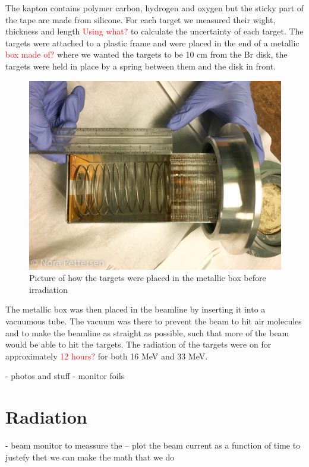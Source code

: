 \documentclass[twoside,english]{uiofysmaster/uiofysmaster}
\begin{document}
\noindent
The kapton contains polymer carbon, hydrogen and oxygen but the sticky part of the tape are made from silicone. For each target we measured their wight, thickness and length \textcolor{red}{Using what?} to calculate the uncertainty of each target. The targets were attached to a plastic frame and were placed in the end of a metallic \textcolor{red}{box made of?} where we wanted the targets to be 10 cm from the Br disk, the targets were held in place by a spring between them and the disk in front. 
\begin{figure} [h]
   \centering
   \includegraphics[scale=.2]{target_stack-1.JPG}
   \caption{Picture of how the targets were placed in the metallic box before irradiation}
   \label{fig:target_stack}
\end{figure}

\noindent
The metallic box was then placed in the beamline by inserting it into a vacuumous tube. The vacuum was there to prevent the beam to hit air molecules and to make the beamline as straight as possible, such that more of the beam would be able to hit the targets. The radiation of the targets were on for approximately \textcolor{red}{12 hours?} for both 16 MeV and 33 MeV. 
\cite{E.Lawrence}


- photos and stuff
- monitor foils



\section{Radiation}
\label{sec:radiation}


- beam monitor to meassure the  
-- plot the beam current  as a function of time to justefy thet we can make the math that we do
\end{document}
